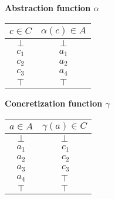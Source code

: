\documentclass[12pt]{article}
\begin{document}
\begin{enumerate}
\begin{enumerate}
\begin{mdframed}

        \begin{center}
    \begin{minipage}{0.45\textwidth}
    \centering
    \textbf{Abstraction function \( \alpha \)}\\[0.5em]
    \begin{tabular}{|c|c|}
    \hline
    \( c \in C \) & \( \alpha(c) \in A \) \\
    \hline
    \( \bot \) & \( \bot \) \\
    \( c_1 \) & \( a_1 \) \\
    \( c_2 \) & \( a_2 \) \\
    \( c_3 \) & \( a_4 \) \\
    \( \top \) & \( \top \) \\
    \hline
    \end{tabular}
    \end{minipage}
    \hspace{1cm}
    \begin{minipage}{0.45\textwidth}
    \centering
    \textbf{Concretization function \( \gamma \)}\\[0.5em]
    \begin{tabular}{|c|c|}
    \hline
    \( a \in A \) & \( \gamma(a) \in C \) \\
    \hline
    \( \bot \) & \( \bot \) \\
    \( a_1 \) & \( \ c_1 \) \\
    \( a_2 \) & \( \ c_2 \) \\
    \( a_3 \) & \( \ c_3 \) \\
    \( a_4 \) & \( \top \) \\
    \( \top \) & \( \top \) \\
    \hline
    \end{tabular}
    \end{minipage}
    \end{center}
    

\end{mdframed}
\end{enumerate}
\end{enumerate}
\end{document}
